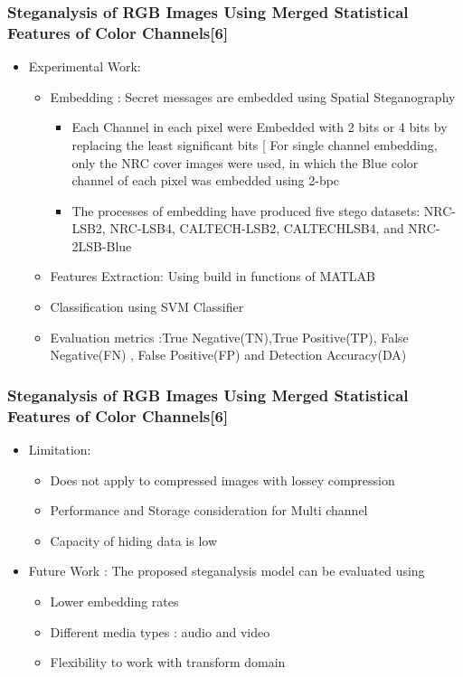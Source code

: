 \documentclass{beamer} %
\theoremstyle{definition} %
\begin{document}
\begin{frame}
\frametitle{Steganalysis of RGB Images Using Merged Statistical Features of Color Channels[6]}
\begin{itemize}
\item Experimental Work:
 \begin{itemize}
 	 	\item Embedding : Secret messages are embedded using Spatial Steganography
 	\begin{itemize}
 	\item Each Channel in each pixel were Embedded with 2 bits or 4 bits by replacing the least significant bits [  For single channel embedding, only the NRC cover images were used, in which the Blue color channel of each pixel was embedded using 2-bpc 
 	\item  The processes of embedding have produced five stego datasets: NRC-LSB2, NRC-LSB4, CALTECH-LSB2, CALTECHLSB4, and NRC-2LSB-Blue  
 \end{itemize}
      \item Features Extraction: Using build in functions of MATLAB 
      \item Classification using SVM Classifier
      \item Evaluation metrics :True Negative(TN),True Positive(TP), False Negative(FN) , False Positive(FP) and Detection Accuracy(DA)  
\end{itemize}
\end{itemize}
\end{frame}

\begin{frame}
\frametitle{Steganalysis of RGB Images Using Merged Statistical Features of Color Channels[6] }
\begin{itemize}
\item Limitation: 
 \begin{itemize}
 	\item Does not apply to compressed images with lossey compression 
 	\item Performance and Storage consideration for Multi channel 
 	\item Capacity of hiding data is low 
 \end{itemize}
 \item Future Work : The proposed steganalysis model can be evaluated using 
 \begin{itemize}
 	\item Lower embedding rates 
 	\item Different media types : audio and video  
 	\item Flexibility to work with transform domain  
 \end{itemize}
 \end{itemize}
\end{frame}
\end{document}
